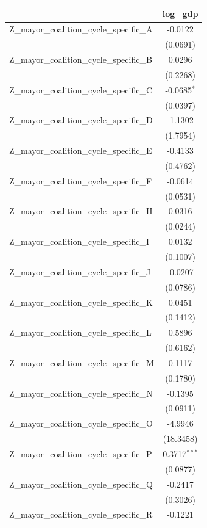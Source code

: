 \begin{tabular}{lc}
\toprule
 & log\_gdp \\
\midrule
Z\_mayor\_coalition\_cycle\_specific\_A & -0.0122 \\
 & (0.0691) \\
Z\_mayor\_coalition\_cycle\_specific\_B & 0.0296 \\
 & (0.2268) \\
Z\_mayor\_coalition\_cycle\_specific\_C & -0.0685$^{*}$ \\
 & (0.0397) \\
Z\_mayor\_coalition\_cycle\_specific\_D & -1.1302 \\
 & (1.7954) \\
Z\_mayor\_coalition\_cycle\_specific\_E & -0.4133 \\
 & (0.4762) \\
Z\_mayor\_coalition\_cycle\_specific\_F & -0.0614 \\
 & (0.0531) \\
Z\_mayor\_coalition\_cycle\_specific\_H & 0.0316 \\
 & (0.0244) \\
Z\_mayor\_coalition\_cycle\_specific\_I & 0.0132 \\
 & (0.1007) \\
Z\_mayor\_coalition\_cycle\_specific\_J & -0.0207 \\
 & (0.0786) \\
Z\_mayor\_coalition\_cycle\_specific\_K & 0.0451 \\
 & (0.1412) \\
Z\_mayor\_coalition\_cycle\_specific\_L & 0.5896 \\
 & (0.6162) \\
Z\_mayor\_coalition\_cycle\_specific\_M & 0.1117 \\
 & (0.1780) \\
Z\_mayor\_coalition\_cycle\_specific\_N & -0.1395 \\
 & (0.0911) \\
Z\_mayor\_coalition\_cycle\_specific\_O & -4.9946 \\
 & (18.3458) \\
Z\_mayor\_coalition\_cycle\_specific\_P & 0.3717$^{***}$ \\
 & (0.0877) \\
Z\_mayor\_coalition\_cycle\_specific\_Q & -0.2417 \\
 & (0.3026) \\
Z\_mayor\_coalition\_cycle\_specific\_R & -0.1221 \\

\end{tabular}
